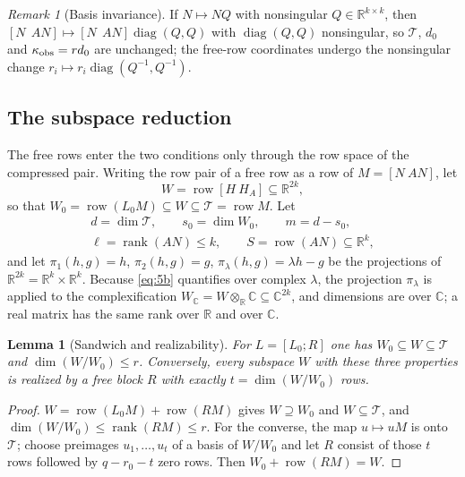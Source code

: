 \documentclass[journal]{IEEEtran}
\theoremstyle{plainn}
\newtheorem{lem}[thm]{Lemma}
\theoremstyle{remark}
\newtheorem{remark}{Remark}
\begin{document}
\begin{remark}[Basis invariance]
If $N\mapsto NQ$ with nonsingular $Q\in\mathbb R^{k\times k}$, then
$[N\ \ AN]\mapsto[N\ \ AN]\operatorname{diag}(Q,Q)$ with $\operatorname{diag}(Q,Q)$ nonsingular, so
$\mathcal T$, $d_0$ and $\kappa_{\rm obs}=rd_0$ are unchanged; the free-row coordinates undergo the
nonsingular change $r_i\mapsto r_i\operatorname{diag}(Q^{-1},Q^{-1})$.
\end{remark}

\subsection{The subspace reduction}\label{sec:subspace}

The free rows enter the two conditions only through the row space of the compressed
pair. Writing the row pair of a free row as a row of $M=[N\ AN]$, let
\begin{equation}\label{eq:W-def}
W=\operatorname{row}[H\ H_A]\subseteq\mathbb R^{2k},
\end{equation}
so that $W_0=\operatorname{row}(L_0M)\subseteq W\subseteq\mathcal T=\operatorname{row}M$.
Let
\begin{equation}\label{eq:ell}
\begin{gathered}
d=\dim\mathcal T,\qquad s_0=\dim W_0,\qquad m=d-s_0,\\
\ell=\operatorname{rank}(AN)\le k,\qquad S=\operatorname{row}(AN)\subseteq\mathbb R^k ,
\end{gathered}
\end{equation}
and let $\pi_1(h,g)=h$, $\pi_2(h,g)=g$, $\pi_\lambda(h,g)=\lambda h-g$ be the projections of
$\mathbb R^{2k}=\mathbb R^k\times\mathbb R^k$. Because \eqref{eq:5b} quantifies over complex
$\lambda$, the projection $\pi_\lambda$ is applied to the complexification
$W_{\mathbb C}=W\otimes_{\mathbb R}\mathbb C\subseteq\mathbb C^{2k}$, and dimensions are over
$\mathbb C$; a real matrix has the same rank over $\mathbb R$ and over $\mathbb C$.

\begin{lem}[Sandwich and realizability]\label{lem:sandwich}
For $L=[L_0;R]$ one has $W_0\subseteq W\subseteq\mathcal T$ and
$\dim(W/W_0)\le r$. Conversely, every subspace $W$ with these three properties is realized by a
free block $R$ with exactly $t=\dim(W/W_0)$ rows.
\end{lem}

\begin{proof}
$W=\operatorname{row}(L_0M)+\operatorname{row}(RM)$ gives $W\supseteq W_0$ and
$W\subseteq\mathcal T$, and $\dim(W/W_0)\le\operatorname{rank}(RM)\le r$. For the converse, the
map $u\mapsto uM$ is onto $\mathcal T$; choose preimages $u_1,\dots,u_t$ of a basis of
$W/W_0$ and let $R$ consist of those $t$ rows followed by $q-r_0-t$ zero rows. Then
$W_0+\operatorname{row}(RM)=W$.
\end{proof}
\end{document}
